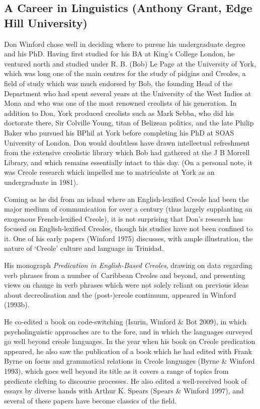 \documentclass[output=paper, colorlinks,citecolor=brown]{langscibook}
\begin{document}
\subsection{A Career in Linguistics (Anthony Grant, Edge Hill University)}

Don Winford chose well in deciding where to pursue his undergraduate degree and his  PhD.  Having first studied for his BA at King’s College London, he ventured north and  studied under R. B. (Bob) Le Page at the University of York, which was long one of the main centres for the study of pidgins and Creoles, a field of study which was  much endorsed by Bob, the founding Head of the Department who had spent several years at the University of the West Indies at Mona and who was one of the most renowned creolists of his generation.  In addition to Don, York produced creolists such as Mark Sebba, who did his doctorate there, Sir Colville Young, titan of Belizean politics,  and the late Philip Baker who pursued his BPhil at York before completing his PhD at SOAS University of London.  Don would doubtless have drawn intellectual refreshment from the extensive creolistic library which Bob had gathered at the J B Morrell Library, and which remains essentially intact to this day.  (On a personal note, it was Creole research which impelled me to matriculate at York as an undergraduate in 1981).

Coming as he did from an island where an English-lexified Creole had been the major medium of communication for over a century (thus largely supplanting an exogenous French-lexified Creole), it is not surprising that Don’s research has focused on English-lexified Creoles, though his studies have not been confined to it.  One of his early papers (Winford 1975) discusses, with ample illustration, the nature of ‘Creole’ culture and language in Trinidad.


His monograph \textit{Predication in  English-Based Creoles}, drawing on data regarding verb phrases from a number of Caribbean Creoles and beyond,  and presenting views on change in verb phrases  which were not solely reliant on previous ideas about decreolisation and the (post-)creole continuum, appeared in Winford (1993b).


He co-edited a  book on code-switching (Isurin, Winford \& Bot 2009), in which psycholinguistic approaches are to the fore, and in which the languages surveyed go well beyond creole languages.  In the year when his book on Creole predication appeared, he  also saw the publication of a book which he had edited with Frank Byrne on focus and grammatical relations in Creole languages  (Byrne \& Winford 1993), which goes well beyond its title as it covers a range of topics from predicate clefting to discourse processes. He also edited a well-received book of essays by diverse hands with Arthur K. Spears (Spears \& Winford 1997), and several of these papers have become classics of the field. 
\end{document}

